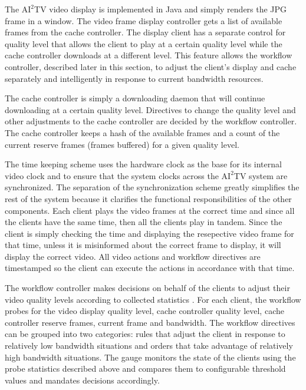 \documentclass{sig-alternate}
\begin{document}
%
The $\mathrm{AI}^2$TV video display is implemented in Java and simply
renders the JPG frame in a window.  The video frame display controller
gets a list of available frames from the cache controller.  The
display client has a separate control for quality level that allows
the client to play at a certain quality level while the cache
controller downloads at a different level.  This feature allows the
workflow controller, described later in this section, to adjust the
client's display and cache separately and intelligently in response to
current bandwidth resources.

The cache controller is simply a downloading daemon that will continue
downloading at a certain quality level.  Directives to change the
quality level and other adjustments to the cache controller are
decided by the workflow controller.  The cache controller keeps a hash
of the available frames and a count of the current reserve frames
(frames buffered) for a given quality level.


The time keeping scheme uses the hardware clock as the base for its
internal video clock and  to ensure that the system clocks across
the $\mathrm{AI}^2$TV system are synchronized.  The separation of the
synchronization scheme greatly simplifies the rest of the system
because it clarifies the functional responsibilities of the other
components.  Each client plays the video frames at the correct time
and since all the clients have the same time, then all the clients
play in tandem.  Since the client is simply checking the time and
displaying the resepective video frame for that time, unless it is
misinformed about the correct frame to display, it will display the
correct video.  All video actions and workflow directives are
timestamped so the client can execute the actions in accordance with
that time.

The workflow controller makes decisions on behalf of the clients to
adjust their video quality levels according to collected statistics .
For each client, the workflow probes for the video display quality
level, cache controller quality level, cache controller reserve
frames, current frame and bandwidth.  The workflow directives can be
grouped into two categories: rules that adjust the client in response
to relatively low bandwidth situations and orders that take advantage
of relatively high bandwidth situations.  The gauge monitors the state
of the clients using the probe statistics described above and compares
them to configurable threshold values and mandates decisions
accordingly.
\end{document}
